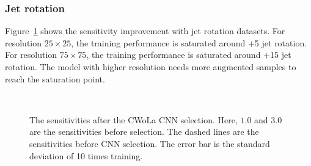 \documentclass[12pt]{article}
\begin{document}
		\subsubsection{Jet rotation}%
		\label{subs:jet_rotation}
			Figure~\ref{fig:sensitivity_improvement_origin_jet_aug_SB_1_3} shows the sensitivity improvement with jet rotation datasets. For resolution $25\times 25$, the training performance is saturated around +5 jet rotation. For resolution $75\times 75$, the training performance is saturated around +15 jet rotation. The model with higher resolution needs more augmented samples to reach the saturation point.
			\begin{figure}[htpb]
				\centering
				 \\
				\caption{The sensitivities after the CWoLa CNN selection. Here, $1.0$ and $3.0$ are the sensitivities before selection. The dashed lines are the sensitivities before CNN selection. The error bar is the standard deviation of 10 times training.}
				\label{fig:sensitivity_improvement_origin_jet_aug_SB_1_3}
			\end{figure}
\end{document}
